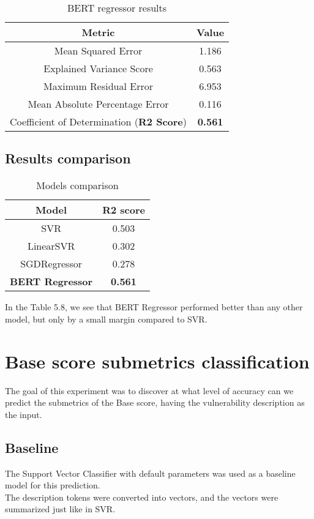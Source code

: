 \documentclass[times, utf8, zavrsni, english]{fer}
\begin{document}
\begin{table}[h!]
		\centering
		\begin{tabular}{|| c | c ||} 
			\hline
			Metric & Value \\ [0.5ex] 
			\hline\hline
			Mean Squared Error & 1.186  \\ \hline
			Explained Variance Score & 0.563\\ \hline
			Maximum Residual Error & 6.953 \\ \hline
			Mean Absolute Percentage Error & 0.116 \\ \hline
			Coefficient of Determination (\textbf{R2 Score}) & \textbf{0.561} \\
			\hline
		\end{tabular}
		\caption{BERT regressor results}
		\label{table:9}
\end{table}
\subsection{Results comparison}
\begin{table}[h!]
	\centering
	\begin{tabular}{|| c | c ||} 
		\hline
		Model & R2 score \\ [0.5ex] 
		\hline\hline
		SVR & 0.503  \\ \hline
		LinearSVR & 0.302 \\ \hline
		SGDRegressor & 0.278 \\ \hline
		\textbf{BERT Regressor} & \textbf{0.561} \\ 
	
		\hline
	\end{tabular}
	\caption{Models comparison}
	\label{table:10}
\end{table}

In the Table 5.8, we see that BERT Regressor performed better than any other model, but only by a small margin compared to SVR.

\section{Base score submetrics classification}
The goal of this experiment was to discover at what level of accuracy can we predict the submetrics of the Base score, having the vulnerability description as the input.
\subsection{Baseline}
The Support Vector Classifier with default parameters was used as a baseline model for this prediction.\\
The description tokens were converted into vectors, and the vectors were summarized just like in SVR.
\end{document}
